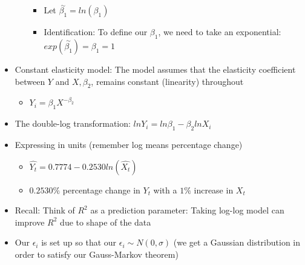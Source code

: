 \documentclass[10pt, oneside]{article}
\begin{document}
\begin{itemize}
\begin{itemize}
\begin{itemize}
            \item Let $\overset{\sim}{ \beta_1} = ln(\beta_1)$
            \item Identification: To define our $\beta_1$, we need to take an exponential: $exp(\overset{\sim}{\beta_1}) = \beta_1 = 1$
        \end{itemize}
    \end{itemize}
    \item Constant elasticity model: The model assumes that the elasticity coefficient between $Y$ and $X, \beta_2$, remains constant (linearity) throughout
    \begin{itemize}
        \item $Y_i = \beta_1 X ^{-\beta_2}$
    \end{itemize}
    \item The double-log transformation: $ln Y_i = ln\beta_1 - \beta_2 ln X_i$
    \item Expressing in units (remember log means percentage change)
    \begin{itemize}
        \item $\widehat{Y_t} = 0.7774 - 0.2530 ln(\widehat{X_t})$
        \item $0.2530\%$ percentage change in $Y_t$ with a $1\%$ increase in $X_t$
    \end{itemize}
    \item Recall: Think of $R^2$ as a prediction parameter: Taking log-log model can improve $R^2$ due to shape of the data
    \item Our $\epsilon_i$ is set up so that our $\epsilon_i \sim N(0, \sigma)$ (we get a Gaussian distribution in order to satisfy our Gauss-Markov theorem)
\end{itemize}
\end{document}
